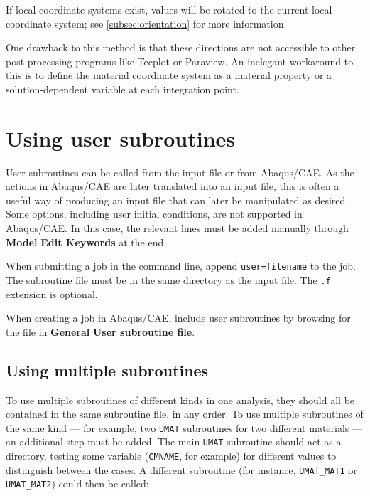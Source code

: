 \documentclass[10pt,letterpaper,oneside]{report}
\begin{document}
If local coordinate systems exist, values will be rotated to the current local coordinate system; see \autoref{subsec:orientation} for more information.  

One drawback to this method is that these directions are not accessible to other post-processing programs like Tecplot or Paraview.  An inelegant workaround to this is to define the material coordinate system as a material property or a solution-dependent variable at each integration point. 


\section{Using user subroutines}
User subroutines can be called from the input file or from Abaqus/CAE.  As the actions in Abaqus/CAE are later translated into an input file, this is often a useful way of producing an input file that can later be manipulated as desired. Some options, including user initial conditions, are not supported in Abaqus/CAE.  In this case, the relevant lines must be added manually through \textbf{Model} \textrightarrow \textbf{Edit Keywords} at the end.

When submitting a job in the command line, append \texttt{user=filename} to the job.  The subroutine file must be in the same directory as the input file.  The \texttt{.f} extension is optional.  

When creating a job in Abaqus/CAE, include user subroutines by browsing for the file in \textbf{General} \textrightarrow \textbf{User subroutine file}.


\subsection{Using multiple subroutines}
\label{subsec:multiple}
To use multiple subroutines of different kinds in one analysis, they should all be contained in the same subroutine file, in any order.  To use multiple subroutines of the same kind --- for example, two \texttt{UMAT} subroutines for two different materials --- an additional step must be added.  The main \texttt{UMAT} subroutine should act as a directory, testing some variable (\texttt{CMNAME}, for example) for different values to distinguish between the cases.  A different subroutine (for instance, \texttt{UMAT\_MAT1} or \texttt{UMAT\_MAT2}) could then be called:
\end{document}
